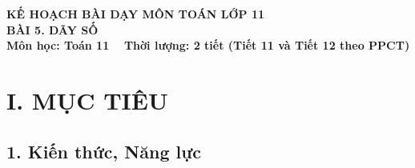 \documentclass[12pt, a4paper]{article}
\begin{document}
  
  
\begin{center}  
    {\fontsize{14pt}{17pt}\selectfont \textbf{KẾ HOẠCH BÀI DẠY MÔN TOÁN LỚP 11}}\\[6pt]  
    {\fontsize{16pt}{19pt}\selectfont \textbf{BÀI 5. DÃY SỐ}}\\[4pt]  
    {\fontsize{12pt}{15pt}\selectfont \textbf{Môn học: Toán 11} \ \textbar \ \textbf{Thời lượng: 2 tiết (Tiết 11 và Tiết 12 theo PPCT)}}  
\end{center}  
  
\vspace{5pt}  
  
\section*{I. MỤC TIÊU}  
  
\subsection*{1. Kiến thức, Năng lực}  
  
\end{document}
